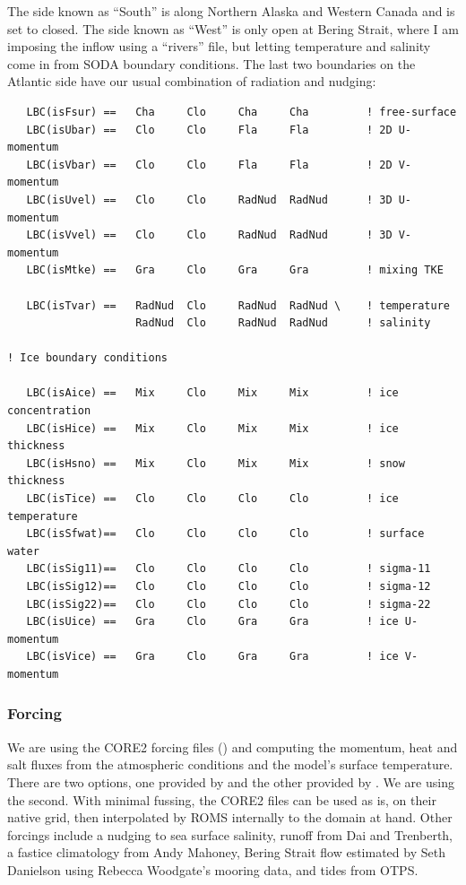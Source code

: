 The side known as ``South'' is along Northern Alaska and Western
Canada and is set to closed. The side known as ``West'' is only open
at Bering Strait, where I am imposing the inflow using a ``rivers''
file, but letting temperature and salinity come in from SODA
boundary conditions. The last two boundaries on the Atlantic side
have our usual combination of radiation and nudging:
\begin{verbatim}
   LBC(isFsur) ==   Cha     Clo     Cha     Cha         ! free-surface
   LBC(isUbar) ==   Clo     Clo     Fla     Fla         ! 2D U-momentum
   LBC(isVbar) ==   Clo     Clo     Fla     Fla         ! 2D V-momentum
   LBC(isUvel) ==   Clo     Clo     RadNud  RadNud      ! 3D U-momentum
   LBC(isVvel) ==   Clo     Clo     RadNud  RadNud      ! 3D V-momentum
   LBC(isMtke) ==   Gra     Clo     Gra     Gra         ! mixing TKE

   LBC(isTvar) ==   RadNud  Clo     RadNud  RadNud \    ! temperature
                    RadNud  Clo     RadNud  RadNud      ! salinity

! Ice boundary conditions

   LBC(isAice) ==   Mix     Clo     Mix     Mix         ! ice concentration
   LBC(isHice) ==   Mix     Clo     Mix     Mix         ! ice thickness
   LBC(isHsno) ==   Mix     Clo     Mix     Mix         ! snow thickness
   LBC(isTice) ==   Clo     Clo     Clo     Clo         ! ice temperature
   LBC(isSfwat)==   Clo     Clo     Clo     Clo         ! surface water
   LBC(isSig11)==   Clo     Clo     Clo     Clo         ! sigma-11
   LBC(isSig12)==   Clo     Clo     Clo     Clo         ! sigma-12
   LBC(isSig22)==   Clo     Clo     Clo     Clo         ! sigma-22
   LBC(isUice) ==   Gra     Clo     Gra     Gra         ! ice U-momentum
   LBC(isVice) ==   Gra     Clo     Gra     Gra         ! ice V-momentum

\end{verbatim}

\subsubsection{Forcing}
We are using the CORE2 forcing files (\cite{Large_08}) and computing the
momentum, heat and salt fluxes from the atmospheric conditions and the
model's surface temperature. There are two options, one provided by
 and the other provided by . We
are using the second. With minimal fussing, the CORE2 files
can be used as is, on their native grid, then interpolated by ROMS
internally to the domain at hand. Other forcings include a nudging
to sea surface salinity, runoff from Dai and Trenberth, a fastice
climatology from Andy Mahoney, Bering Strait flow estimated by Seth
Danielson using Rebecca Woodgate's mooring data, and tides from OTPS.

